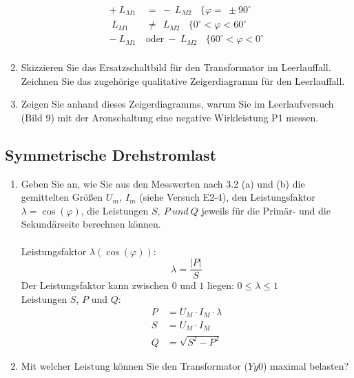 \begin{enumerate}[label=\alph*)]
\begin{align*}
          +\ L_{M1}   & =\ -\ L_{M2}\ \ \ \ \{ \varphi =\ \pm90^\circ                \\
          \ L_{M1}    & \neq\ \ L_{M2}\ \ \ \ \{ 0^\circ< \varphi < 60^\circ         \\
          -\ L_{M1}\  & \text{oder}\ -\ L_{M2}\ \ \ \ \{ 60^\circ< \varphi < 0^\circ \\
        \end{align*}
  \item Skizzieren Sie das Ersatzschaltbild für den Transformator im Leerlauffall.
        Zeichnen Sie das zugehörige qualitative Zeigerdiagramm für den Leerlauffall.
  \item Zeigen Sie anhand dieses Zeigerdiagramms, warum Sie im Leerlaufversuch (Bild 9)
        mit der Aronschaltung eine negative Wirkleistung P1 messen.
\end{enumerate}
\subsection{Symmetrische Drehstromlast }
\begin{enumerate}[label=\alph*)]
  \item Geben Sie an, wie Sie aus den Messwerten nach 3.2 (a) und (b) die gemittelten
        Größen $U_m,\ I_m$ (siehe Versuch E2-4), den Leistungsfaktor
        $\lambda=\cos(\varphi)$, die Leistungen $S,\ P\ und\ Q$ jeweils für die Primär-
        und die Sekundärseite berechnen können.\\ \ \\
        Leistungsfaktor $\lambda(\cos (\varphi))$:
        \[ \lambda = \frac{|P|}{S} \]
        Der Leistungsfaktor kann zwischen $0$ und $1$ liegen: $0 \leq \lambda \leq 1 $\\
        Leistungen $S$, $P$ und $Q$:\\
        \begin{align*}
        	P &= U_M\cdot I_M\cdot \lambda\\
        	S &= U_M\cdot I_M\\
        	Q &= \sqrt{S^2-P^2}
        \end{align*}
        
  \item Mit welcher Leistung können Sie den Transformator ($Yy0$) maximal belasten?
\end{enumerate}
